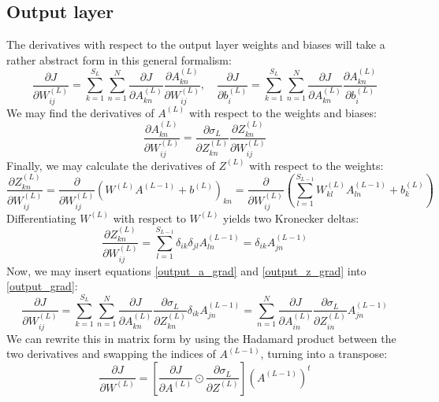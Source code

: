 \documentclass[12pt, a4paper]{article}
\numberwithin{equation}{section}
\begin{document}
\subsection{Output layer}
The derivatives with respect to the output layer weights and biases will take a rather abstract form in this general formalism:
\begin{equation}
\label{output_grad}
\frac{\partial J}{\partial W^{(L)}_{ij}}=\sum_{k=1}^{S_L}\sum_{n=1}^N\frac{\partial J}{\partial A^{(L)}_{kn}}\frac{\partial A^{(L)}_{kn}}{\partial W^{(L)}_{ij}},\quad\frac{\partial J}{\partial b^{(L)}_i}=\sum_{k=1}^{S_L}\sum_{n=1}^N\frac{\partial J}{\partial A^{(L)}_{kn}}\frac{\partial A^{(L)}_{kn}}{\partial b^{(L)}_i}
\end{equation}
We may find the derivatives of $A^{(L)}$ with respect to the weights and biases:
\begin{equation}
\label{output_a_grad}
\frac{\partial A^{(L)}_{kn}}{\partial W^{(L)}_{ij}}=\frac{\partial\sigma_L}{\partial Z^{(L)}_{kn}}\frac{\partial Z^{(L)}_{kn}}{\partial W^{(L)}_{ij}}
\end{equation}
Finally, we may calculate the derivatives of $Z^{(L)}$ with respect to the weights:
\begin{equation}
\frac{\partial Z^{(L)}_{kn}}{\partial W^{(L)}_{ij}}=\frac{\partial}{\partial W^{(L)}_{ij}}(W^{(L)}A^{(L-1)}+b^{(L)})_{kn}=\frac{\partial}{\partial W^{(L)}_{ij}}\left(\sum_{l=1}^{S_{L-1}}W^{(L)}_{kl}A^{(L-1)}_{ln}+b^{(L)}_k\right)
\end{equation}
Differentiating $W^{(L)}$ with respect to $W^{(L)}$ yields two Kronecker deltas:
\begin{equation}
\label{output_z_grad}
\frac{\partial Z^{(L)}_{kn}}{\partial W^{(L)}_{ij}}=\sum_{l=1}^{S_{L-1}}\delta_{ik}\delta_{jl}A^{(L-1)}_{ln}=\delta_{ik} A^{(L-1)}_{jn}
\end{equation}
Now, we may insert equations \ref{output_a_grad} and \ref{output_z_grad} into \ref{output_grad}:
\begin{equation}
\frac{\partial J}{\partial W^{(L)}_{ij}}=\sum_{k=1}^{S_L}\sum_{n=1}^N\frac{\partial J}{\partial A^{(L)}_{kn}}\frac{\partial\sigma_L}{\partial Z^{(L)}_{kn}}\delta_{ik} A^{(L-1)}_{jn}=\sum_{n=1}^N\frac{\partial J}{\partial A^{(L)}_{in}}\frac{\partial\sigma_L}{\partial Z^{(L)}_{in}}A^{(L-1)}_{jn}
\end{equation}
We can rewrite this in matrix form by using the Hadamard product between the two derivatives and swapping the indices of $A^{(L-1)}$, turning into a transpose:
\begin{equation}
\label{output_weights_matrix}
\frac{\partial J}{\partial W^{(L)}}=\left[\frac{\partial J}{\partial A^{(L)}}\odot\frac{\partial\sigma_L}{\partial Z^{(L)}}\right]\left(A^{(L-1)}\right)^t
\end{equation}
\end{document}
